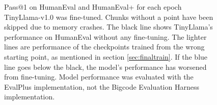 \begin{figure}[!h]
    \caption{Pass@1 on HumanEval and HumanEval+ for each epoch TinyLlama-v1.0 was fine-tuned. Chunks without a point have been skipped due to memory crashes. The black line shows TinyLlama's performance on HumanEval without any fine-tuning.
    The lighter lines are performance of the checkpoints trained from the wrong starting point, as mentioned in section \ref{sec:finaltrain}. If the blue line goes below the black, the model's performance has worsened from fine-tuning. Model performance was evaluated with the EvalPlus implementation, not the Bigcode Evaluation Harness implementation.}
    \label{fig:humaneval}
\end{figure}

